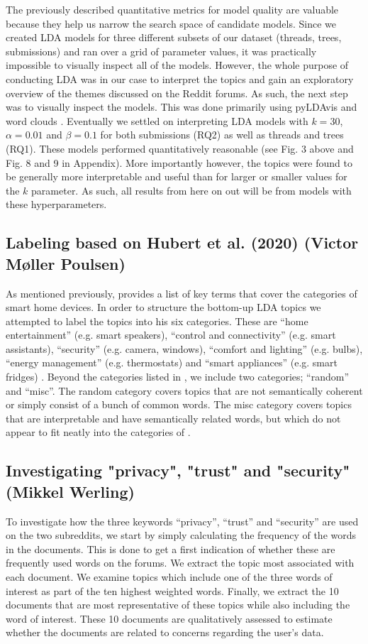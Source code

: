 \documentclass{article}
\begin{document}
The previously described quantitative metrics for model quality are valuable because they help us narrow the search space of candidate models. Since we created LDA models for three different subsets of our dataset (threads, trees, submissions) and ran over a grid of parameter values, it was practically impossible to visually inspect all of the models. However, the whole purpose of conducting LDA was in our case to interpret the topics and gain an exploratory overview of the themes discussed on the Reddit forums. As such, the next step was to visually inspect the models. This was done primarily using pyLDAvis and word clouds \cite{sievert2014ldavis}. 
Eventually we settled on interpreting LDA models with $k = 30$, $\alpha = 0.01$ and $\beta = 0.1$ for both submissions (RQ2) as well as threads and trees (RQ1). These models performed quantitatively reasonable (see Fig. 3 above and Fig. 8 and 9 in Appendix). More importantly however, the topics were found to be generally more interpretable and useful than for larger or smaller values for the $k$ parameter. As such, all results from here on out will be from models with these hyperparameters. 

    \subsection{Labeling based on Hubert et al. (2020) (Victor Møller Poulsen)}
    As mentioned previously,  provides a list of key terms that cover the categories of smart home devices. In order to structure the bottom-up LDA topics we attempted to label the topics into his six categories. These are “home entertainment” (e.g. smart speakers), “control and connectivity” (e.g. smart assistants), “security” (e.g. camera, windows), “comfort and lighting” (e.g. bulbs), “energy management” (e.g. thermostats) and “smart appliances” (e.g. smart fridges) \cite[p. 1]{hubert2020take}. Beyond the categories listed in , we include two categories; “random” and “misc”. The random category covers topics that are not semantically coherent or simply consist of a bunch of common words. The misc category covers topics that are interpretable and have semantically related words, but which do not appear to fit neatly into the categories of .  
    
    \subsection{Investigating "privacy", "trust" and "security" (Mikkel Werling)}
    To investigate how the three keywords “privacy”, “trust” and “security” are used on the two subreddits, we start by simply calculating the frequency of the words in the documents. This is done to get a first indication of whether these are frequently used words on the forums. We extract the topic most associated with each document. We examine topics which include one of the three words of interest as part of the ten highest weighted words. Finally, we extract the 10 documents that are most representative of these topics while also including the word of interest. These 10 documents are qualitatively assessed to estimate whether the documents are related to concerns regarding the user's data. 
\end{document}
